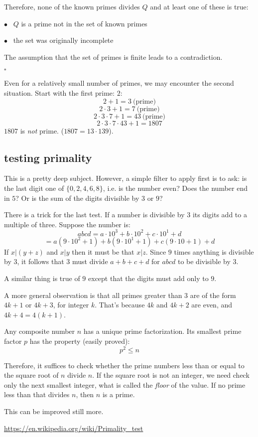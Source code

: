 \documentclass[11pt, oneside]{article}
\begin{document}
Therefore, none of the known primes divides $Q$ and at least one of these is true:

$\bullet$ \  $Q$ is a prime not in the set of known primes

$\bullet$ \ the set was originally incomplete

The assumption that the set of primes is finite leads to a contradiction.

$\square$

Even for a relatively small number of primes, we may encounter the second situation.  Start with the first prime:  $2$:
\[ 2 + 1 = 3 \ \text{(prime)} \]
\[ 2 \cdot 3 + 1 = 7 \ \text{(prime)}  \]
\[ 2 \cdot 3 \cdot 7 +1 = 43 \ \text{(prime)}  \]
\[ 2 \cdot 3 \cdot 7 \cdot 43 + 1 =  1807 \]
$1807$ is \emph{not} prime.  ($1807 = 13 \cdot 139$).

\subsection*{testing primality}
This is a pretty deep subject.  However, a simple filter to apply first is to ask:  is the last digit one of $\{ 0,2,4,6,8 \}$, i.e. is the number even?  Does the number end in $5$?  Or is the sum of the digits divisible by $3$ or $9$?

There is a trick for the last test.  If a number is divisible by $3$ its digits add to a multiple of three.  Suppose the number is:
\[ abcd = a \cdot 10^3 + b \cdot 10^2 + c \cdot 10^1 + d \]
\[ = a (9 \cdot 10^2 + 1) + b (9 \cdot 10^1 + 1) + c (9 \cdot 10 + 1) + d \]
If $x|(y+z)$ and $x|y$ then it must be that $x|z$.  Since $9$ times anything is divisible by $3$, it follows that $3$ must divide $a + b + c + d$ for $abcd$ to be divisible by $3$.

A similar thing is true of $9$ except that the digits must add only to $9$.

A more general observation is that all primes greater than $3$ are of the form $4k + 1$ or $4k + 3$, for integer $k$.  That's because $4k$ and $4k + 2$ are even, and $4k + 4 = 4(k + 1)$.

Any composite number $n$ has a unique prime factorization.  Its smallest prime factor $p$ has the property (easily proved):
\[ p^2 \le n \]

Therefore, it suffices to check whether the prime numbers less than or equal to the square root of $n$ divide $n$.  If the square root is not an integer, we need check only the next smallest integer, what is called the \emph{floor} of the value.  If no prime less than that divides $n$, then $n$ is a prime.

This can be improved still more.

\url{https://en.wikipedia.org/wiki/Primality_test}
\end{document}
